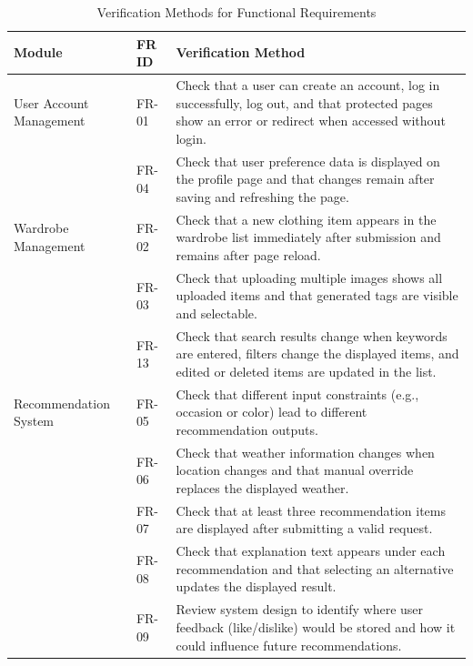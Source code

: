 \newpage 
\begin{table}[h]
\centering
\small
\caption{Verification Methods for Functional Requirements}
\label{tab:FR_verification}
\renewcommand{\arraystretch}{1.2}
\begin{tabular}{p{3.2cm}p{1.5cm}p{10cm}}
\toprule
\textbf{Module} & \textbf{FR ID} & \textbf{Verification Method} \\
\midrule

User Account Management 
& FR-01 
& Check that a user can create an account, log in successfully, log out, and that protected pages show an error or redirect when accessed without login. \\

& FR-04 
& Check that user preference data is displayed on the profile page and that changes remain after saving and refreshing the page. \\

Wardrobe Management 
& FR-02 
& Check that a new clothing item appears in the wardrobe list immediately after submission and remains after page reload. \\

& FR-03 
& Check that uploading multiple images shows all uploaded items and that generated tags are visible and selectable. \\

& FR-13 
& Check that search results change when keywords are entered, filters change the displayed items, and edited or deleted items are updated in the list. \\

Recommendation System 
& FR-05 
& Check that different input constraints (e.g., occasion or color) lead to different recommendation outputs. \\

& FR-06 
& Check that weather information changes when location changes and that manual override replaces the displayed weather. \\

& FR-07 
& Check that at least three recommendation items are displayed after submitting a valid request. \\

& FR-08 
& Check that explanation text appears under each recommendation and that selecting an alternative updates the displayed result. \\

& FR-09 
& Review system design to identify where user feedback (like/dislike) would be stored and how it could influence future recommendations. \\


\end{tabular}
\end{table}

